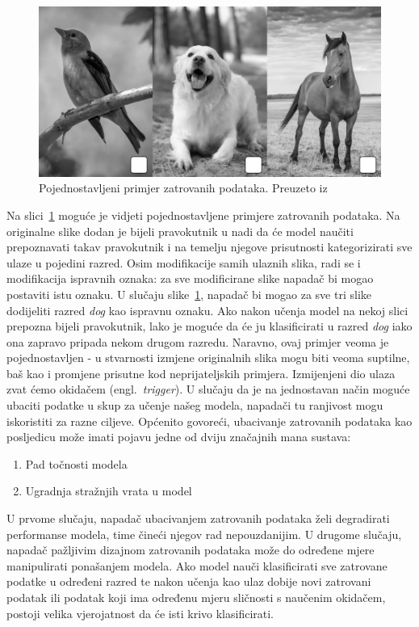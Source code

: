 \documentclass[times, utf8, zavrsni, numeric]{fer}
\begin{document}
\begin{figure}[htb]
    \centering
    \includegraphics[scale=0.4]{poisoned_img.png}
    \caption{Pojednostavljeni primjer zatrovanih podataka. Preuzeto iz~\cite{menon2023poisoned}}
    \label{fig:poisoned_imgs}
\end{figure}

Na slici~\ref{fig:poisoned_imgs} moguće je vidjeti pojednostavljene primjere zatrovanih podataka. 
Na originalne slike dodan je bijeli pravokutnik u nadi da će model naučiti prepoznavati takav pravokutnik i na temelju njegove prisutnosti kategorizirati sve ulaze u pojedini razred.
Osim modifikacije samih ulaznih slika, radi se i modifikacija ispravnih oznaka: za sve modificirane slike napadač bi mogao postaviti istu oznaku.
U slučaju slike~\ref{fig:poisoned_imgs}, napadač bi mogao za sve tri slike dodijeliti razred \textit{dog} kao ispravnu oznaku. 
Ako nakon učenja model na nekoj slici prepozna bijeli pravokutnik, lako je moguće da će ju klasificirati u razred \textit{dog} iako ona zapravo pripada nekom drugom razredu.
Naravno, ovaj primjer veoma je pojednostavljen - u stvarnosti izmjene originalnih slika mogu biti veoma suptilne, baš kao i promjene prisutne kod neprijateljskih primjera.
Izmijenjeni dio ulaza zvat ćemo okidačem (engl.\ \textit{trigger}).
U slučaju da je na jednostavan način moguće ubaciti podatke u skup za učenje našeg modela, napadači tu ranjivost mogu iskoristiti za razne ciljeve.
Općenito govoreći, ubacivanje zatrovanih podataka kao posljedicu može imati pojavu jedne od dviju značajnih mana sustava:

\begin{enumerate}
    \item Pad točnosti modela
    \item Ugradnja stražnjih vrata u model
\end{enumerate}

U prvome slučaju, napadač ubacivanjem zatrovanih podataka želi degradirati performanse modela, time čineći njegov rad nepouzdanijim.
U drugome slučaju, napadač pažljivim dizajnom zatrovanih podataka može do određene mjere manipulirati ponašanjem modela. 
Ako model nauči klasificirati sve zatrovane podatke u određeni razred te nakon učenja kao ulaz dobije novi zatrovani podatak ili podatak koji ima određenu mjeru sličnosti s naučenim okidačem,
postoji velika vjerojatnost da će isti krivo klasificirati.  
\end{document}
